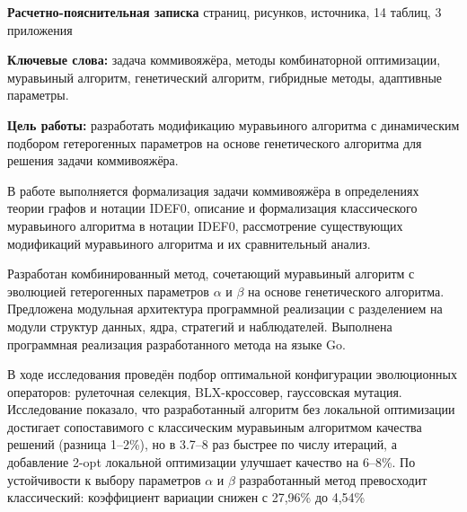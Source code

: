 
\textbf{Расчетно-пояснительная записка} \pageref{LastPage} страниц, \totalfigures{} рисунков,  источника, 14 таблиц, 3 приложения

\textbf{Ключевые слова:} задача коммивояжёра, методы комбинаторной оптимизации, муравьиный алгоритм, генетический алгоритм, гибридные методы, адаптивные параметры.

\textbf{Цель работы:} разработать модификацию муравьиного алгоритма с динамическим подбором гетерогенных параметров на основе генетического алгоритма для решения задачи коммивояжёра.

В работе выполняется формализация задачи коммивояжёра в определениях теории графов и нотации IDEF0, описание и формализация классического муравьиного алгоритма в нотации IDEF0, рассмотрение существующих модификаций муравьиного алгоритма и их сравнительный анализ.

Разработан комбинированный метод, сочетающий муравьиный алгоритм с эволюцией гетерогенных параметров $\alpha$ и $\beta$ на основе генетического алгоритма. Предложена модульная архитектура программной реализации с разделением на модули структур данных, ядра, стратегий и наблюдателей. Выполнена программная реализация разработанного метода на языке Go.

В ходе исследования проведён подбор оптимальной конфигурации эволюционных операторов: рулеточная селекция, BLX-кроссовер, гауссовская мутация. Исследование показало, что разработанный алгоритм без локальной оптимизации достигает сопоставимого с классическим муравьиным алгоритмом качества решений (разница 1–2\%), но в 3.7–8 раз быстрее по числу итераций, а добавление 2-opt локальной оптимизации улучшает качество на 6–8\%. По устойчивости к выбору параметров $\alpha$ и $\beta$ разработанный метод превосходит классический: коэффициент вариации снижен с 27,96\% до 4,54\%

\clearpage
